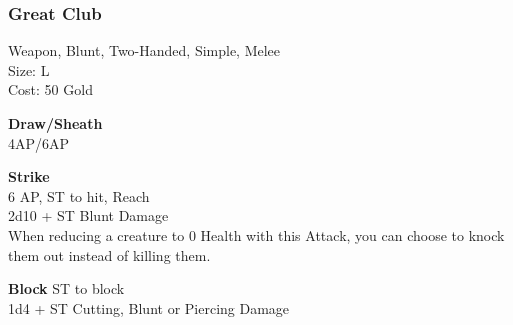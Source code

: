 \subsubsection{Great Club}\label{weapon:greatClub}
Weapon, Blunt, Two-Handed, Simple, Melee\\
Size: L\\
Cost: 50 Gold

\textbf{Draw/Sheath}\\
4AP/6AP

\textbf{Strike} \\
6 AP, ST to hit,  Reach\\
2d10 + \texttimes ST Blunt Damage\\
When reducing a creature to 0 Health with this Attack, you can choose to knock them out instead of killing them.

\textbf{Block}
ST to block\\
1d4 + \texttimes ST Cutting, Blunt or Piercing Damage

